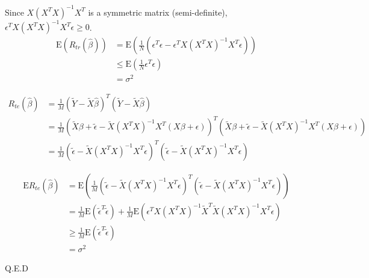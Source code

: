 \documentclass[english]{article}\usepackage[]{graphicx}\usepackage[]{color}
\begin{document}
Since $X(X^{T}X)^{-1}X^{T}$ is a symmetric matrix (semi-definite),
$\epsilon^{T}X(X^{T}X)^{-1}X^{T}\epsilon\geq0$. 
\begin{align*}
\mathrm{E}(R_{tr}(\hat{\beta})) & =\mathrm{E}(\frac{1}{N}(\epsilon^{T}\epsilon-\epsilon^{T}X(X^{T}X)^{-1}X^{T}\epsilon))\\
 & \leq\mathrm{E}(\frac{1}{N}\epsilon^{T}\epsilon)\\
 & =\sigma^{2}
\end{align*}

\begin{align*}
R_{te}(\hat{\beta}) & =\frac{1}{M}(\tilde{Y}-\tilde{X}\hat{\beta})^{T}(\tilde{Y}-\tilde{X}\hat{\beta})\\
 & =\frac{1}{M}(\tilde{X}\beta+\tilde{\epsilon}-\tilde{X}(X^{T}X)^{-1}X^{T}(X\beta+\epsilon))^{T}(\tilde{X}\beta+\tilde{\epsilon}-\tilde{X}(X^{T}X)^{-1}X^{T}(X\beta+\epsilon))\\
 & =\frac{1}{M}(\tilde{\epsilon}-\tilde{X}(X^{T}X)^{-1}X^{T}\epsilon)^{T}(\tilde{\epsilon}-\tilde{X}(X^{T}X)^{-1}X^{T}\epsilon)
\end{align*}

\begin{align*}
\mathrm{E}R_{te}(\hat{\beta}) & =\mathrm{E}(\frac{1}{M}(\tilde{\epsilon}-\tilde{X}(X^{T}X)^{-1}X^{T}\epsilon)^{T}(\tilde{\epsilon}-\tilde{X}(X^{T}X)^{-1}X^{T}\epsilon))\\
 & =\frac{1}{M}\mathrm{E}(\tilde{\epsilon}^{T}\tilde{\epsilon})+\frac{1}{M}\mathrm{E}(\epsilon^{T}X(X^{T}X)^{-1}\tilde{X}^{T}\tilde{X}(X^{T}X)^{-1}X^{T}\epsilon)\\
 & \geq\frac{1}{M}\mathrm{E}(\tilde{\epsilon}^{T}\tilde{\epsilon})\\
 & =\sigma^{2}
\end{align*}

Q.E.D
\end{document}
